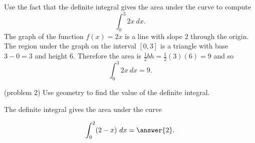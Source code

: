 \documentclass{ximera}
\begin{document}
\begin{example}[example 2]
Use the fact that the definite integral gives the area under the curve to compute
\[\int_0^3 2x \ dx.\]
The graph of the function $f(x) = 2x$ is a line with slope $2$ through the origin. 
The region under the graph on the interval $[0,3]$ is a triangle with base $3-0 = 3$ and height $6$. 
Therefore the area is $\frac12 bh = \frac12(3)(6) = 9$ and so
\[\int_0^3 2x \ dx =9.\]


\begin{image}
\end{image}

\end{example}

\begin{problem}(problem 2)
Use geometry to find the value of the definite integral.
\begin{hint}
The definite integral gives the area under the curve
\end{hint}
\[\int_{0}^{2} (2-x) \ dx = \answer{2}.\]
\end{problem}
\end{document}
